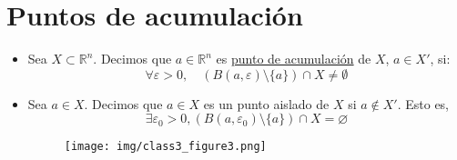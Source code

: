 \section{Puntos de acumulación}

\begin{itemize}
	\item Sea \( X \subset \mathbb{R}^n \). Decimos que \( a \in \mathbb{R}^n \) es \underline{punto de acumulación} de \( X \), \( a \in X' \), si:
	\[
	\forall \varepsilon > 0, \quad \left( B(a, \varepsilon) \setminus \{a\} \right) \cap X \neq \emptyset
	\]  
	 
	\item Sea \( a \in X \). Decimos que \( a \in X \) es un punto aislado de \( X \) si \( a \notin X' \). Esto es, 
	\[
	\exists \varepsilon_0 >0, (B(a, \varepsilon_0) \setminus \{a\}) \cap X = \varnothing
	\]
	
		\vspace{-2em}
	\begin{figure}[H]
		\centering
		\texttt{[image: img/class3\_figure3.png]}
	\end{figure}
	\vspace{-1em}
\end{itemize}
 
